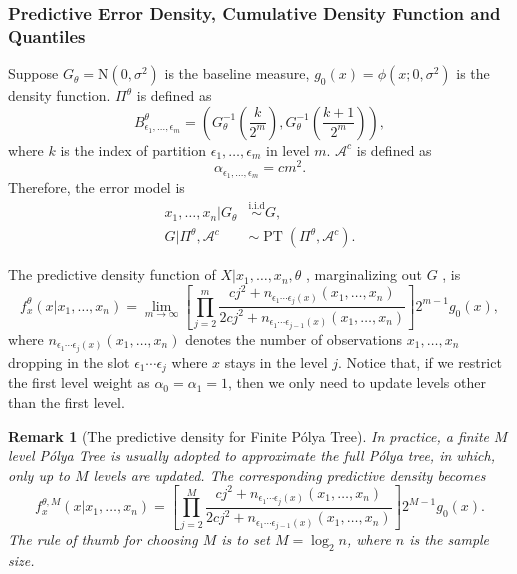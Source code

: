 \documentclass[12pt]{article}
\newtheorem{rmk}[thm]{Remark}
\newcommand{\polya}{P\'{o}lya}
\newcommand{\iid}{\stackrel{\text{i.i.d}}{\sim}}
\DeclareMathOperator{\pt}{PT}
\begin{document}
\subsubsection{Predictive Error Density, Cumulative Density Function
  and Quantiles}
Suppose $G_{\theta} = \mathrm{N}(0, \sigma^2)$ is the baseline
measure, $g_0(x) = \phi(x; 0, \sigma^2)$ is the density
function. $\Pi^{\theta}$ is defined as
\begin{displaymath}
  B^{\theta}_{\epsilon_1, \ldots, \epsilon_m} = \left( G^{-1}_{\theta}
    \left( \frac{k}{2^m} \right) , G^{-1}_{\theta}\left( \frac{k+1}{2^m} \right) \right),
\end{displaymath}
where $k$ is the index of partition $\epsilon_1, \ldots, \epsilon_m$
in level $m$. $\mathcal{A}^c$ is defined as
\begin{displaymath}
  \alpha_{\epsilon_1, \ldots, \epsilon_m} = cm^2.
\end{displaymath}
Therefore, the error model is
\begin{align*}
  x_1, \ldots, x_n |G_{\theta} & \iid G, \\
  G|\Pi^{\theta}, \mathcal{A}^{c} & \sim \pt (\Pi^{\theta},
  \mathcal{A}^{c}).
\end{align*}

The predictive density function of $X|x_1, \ldots, x_n, \theta$ ,
marginalizing out $G$ , is
\begin{equation}
  \label{eq:4}
  f_x^{\theta} (x|x_1, \ldots, x_n)  = \lim_{m \to \infty} \left[
    \prod_{j=2}^m \frac{cj^2 + n_{\epsilon_1 \cdots \epsilon_j(x) }(x_1 , \ldots, x_n)}{2cj^2
      + n_{\epsilon_1 \cdots \epsilon_{j-1}(x)}(x_1, \ldots, x_n)}
  \right]2^{m-1} g_0(x),
\end{equation}
where $n_{\epsilon_1 \cdots \epsilon_j(x) }(x_1 , \ldots, x_n)$
denotes the number of observations $x_1, \ldots, x_n$ dropping in the
slot $\epsilon_1 \cdots \epsilon_j$ where $x$ stays in the level
$j$. Notice that, if  we restrict the first level weight as
$\alpha_0=\alpha_1=1$, then we only need to update levels other than
the first level.

\begin{rmk}[The predictive density for Finite \polya{} Tree]
  In practice, a finite $M$ level \polya{} Tree is usually adopted to
  approximate the full \polya{} tree, in which, only up to $M$ levels are
  updated. The corresponding predictive density becomes
  \begin{equation}
    \label{eq:5}
    f_x^{\theta, M} (x|x_1, \ldots, x_n)  =  \left[
      \prod_{j=2}^M \frac{cj^2 + n_{\epsilon_1 \cdots \epsilon_j(x) }(x_1 , \ldots, x_n)}{2cj^2
        + n_{\epsilon_1 \cdots \epsilon_{j-1}(x)}(x_1, \ldots, x_n)}
    \right]2^{M-1} g_0(x).
  \end{equation}
  The rule of thumb for choosing $M$ is to set $M=\log_2n$, where $n$ is
  the sample size.
\end{rmk}
\end{document}
